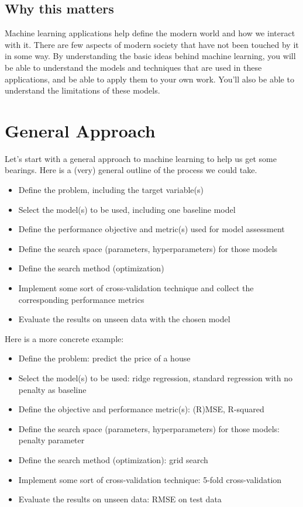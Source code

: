 \documentclass[
  letterpaper,
]{krantz}
\providecommand{\tightlist}{%
  \setlength{\itemsep}{0pt}\setlength{\parskip}{0pt}}\usepackage{longtable,booktabs,array}
\begin{document}
\subsection{Why this matters}\label{why-this-matters}

Machine learning applications help define the modern world and how we
interact with it. There are few aspects of modern society that have not
been touched by it in some way. By understanding the basic ideas behind
machine learning, you will be able to understand the models and
techniques that are used in these applications, and be able to apply
them to your own work. You'll also be able to understand the limitations
of these models.

\section{General Approach}\label{general-approach}

Let's start with a general approach to machine learning to help us get
some bearings. Here is a (very) general outline of the process we could
take.

\begin{itemize}
\tightlist
\item
  Define the problem, including the target variable(s)
\item
  Select the model(s) to be used, including one baseline model
\item
  Define the performance objective and metric(s) used for model
  assessment
\item
  Define the search space (parameters, hyperparameters) for those models
\item
  Define the search method (optimization)
\item
  Implement some sort of cross-validation technique and collect the
  corresponding performance metrics
\item
  Evaluate the results on unseen data with the chosen model
\end{itemize}

Here is a more concrete example:

\begin{itemize}
\tightlist
\item
  Define the problem: predict the price of a house
\item
  Select the model(s) to be used: ridge regression, standard regression
  with no penalty as baseline
\item
  Define the objective and performance metric(s): (R)MSE, R-squared
\item
  Define the search space (parameters, hyperparameters) for those
  models: penalty parameter
\item
  Define the search method (optimization): grid search
\item
  Implement some sort of cross-validation technique: 5-fold
  cross-validation
\item
  Evaluate the results on unseen data: RMSE on test data
\end{itemize}
\end{document}
